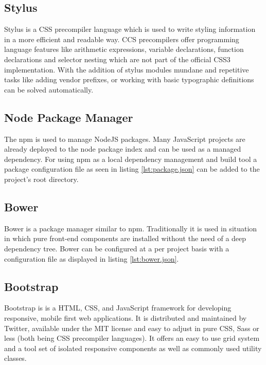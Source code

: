 \documentclass[BachelorPaper]{subfiles}
\begin{document}
\subsection{Stylus}
\label{subsec:mat_stylus}
Stylus is a \ac{CSS} precompiler language which is used to write styling information in a more efficient and readable way. \ac{CCS} precompilers offer programming language features like arithmetic expressions, variable declarations, function declarations and selector nesting which are not part of the official \ac{CSS}3 implementation. With the addition of stylus modules mundane and repetitive tasks like adding vendor prefixes, or working with basic typographic definitions can be solved automatically.

\subsection{Node Package Manager}
\label{subsec:mat_npm}
The \ac{npm} is used to manage NodeJS packages. Many JavaScript projects are already deployed to the node package index and can be used as a managed dependency. For using \ac{npm} as a local dependency management and build tool a package configuration file as seen in listing \ref{lst:package.json} can be added to the project's root directory.\\



\subsection{Bower}
\label{subsec:mat_bower}
Bower is a package manager similar to \ac{npm}. Traditionally it is used in situation in which pure front-end components are installed without the need of a deep dependency tree. Bower can be configured at a per project basis with a configuration file as displayed in listing \ref{lst:bower.json}.\\



\subsection{Bootstrap}
\label{subsec:mat_bootstrap}
Bootstrap is is a \ac{HTML}, \ac{CSS}, and JavaScript framework for developing responsive, mobile first web applications. It is distributed and maintained by Twitter, available under the \ac{MIT} license and easy to adjust in pure \ac{CSS}, Sass or less (both being \ac{CSS} precompiler languages). It offers an easy to use grid system and a tool set of isolated responsive components as well as commonly used utility classes.
\end{document}
